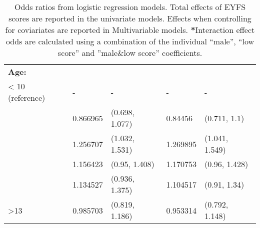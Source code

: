 \begin{table}[h]
\begin{scriptsize}
\begin{tabular}{P{55mm}|P{15mm}P{25mm}|P{15mm}P{25mm}}
\textbf{Age:} & & & & \\
\quad < 10 (reference) & - & - & - & - \\
 & 0.866965 & (0.698, 1.077) & 0.84456 & (0.711, 1.1) \\
 & 1.256707 & (1.032, 1.531) & 1.269895 & (1.041, 1.549) \\
 & 1.156423 & (0.95, 1.408) & 1.170753 & (0.96, 1.428) \\
 & 1.134527 & (0.936, 1.375) & 1.104517 & (0.91, 1.34) \\
\quad >13 & 0.985703 & (0.819, 1.186) & 0.953314 & (0.792, 1.148) \\[2mm]
\bottomrule
\end{tabular}
\end{scriptsize}
\caption{Odds ratios from logistic regression models. Total effects of EYFS scores are reported in the univariate models. Effects when controlling for coviariates are reported in Multivariable models. \textbf{*}Interaction effect odds are calculated using a combination of the individual ``male'', ``low score'' and ''male\&low score'' coefficients.}
\label{tab:regression_results}
\end{table}

\newpage
